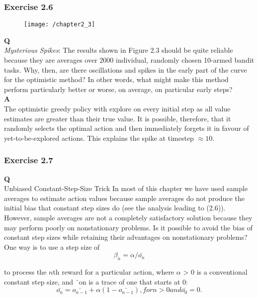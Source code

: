\subsubsection{Exercise 2.6}
\begin{figure}[h!]
	\centering
	\texttt{[image: /chapter2\_3]}
	\caption{}
	\label{fig:chapter2_3}
\end{figure}
\noindent \textbf{Q}\\
\textit{Mysterious Spikes}: The results shown in Figure 2.3 should be quite reliable because they are averages over 2000 individual, randomly chosen 10-armed bandit tasks. Why, then, are there oscillations and spikes in the early part of the curve for the optimistic
method? In other words, what might make this method perform particularly better or worse, on average, on particular early steps?\\

\textbf{A}\\
The optimistic greedy policy with explore on every initial step as all value estimates are greater than their true value. It is possible, therefore, that it randomly selects the optimal action and then immediately forgets it in favour of yet-to-be-explored actions. This explains the spike at timestep \(\approx 10\).

\subsubsection{Exercise 2.7}
\textbf{Q}\\
Unbiased Constant-Step-Size Trick In most of this chapter we have used sample averages to estimate action values because sample averages do not produce the initial bias that constant step sizes do (see the analysis leading to (2.6)). However, sample averages are not a completely satisfactory solution because they may perform poorly on nonstationary problems. Is it possible to avoid the bias of constant step sizes while retaining their advantages on nonstationary problems? One way is to use a step size of
\begin{equation}
	\beta_n = \alpha / \bar{o_n}
\end{equation}

to process the \(n\)th reward for a particular action, where \(\alpha\) > 0 is a conventional constant step size, and ¯on is a trace of one that starts at 0:
\begin{equation}
	\bar{o_n} = \bar{o_{n-1}} + \alpha(1 - \bar{o_{n-1}}), for n > 0 and \bar{o_0} = 0.
\end{equation}

